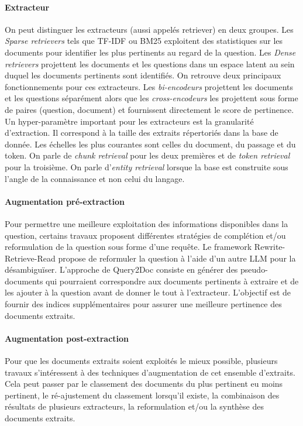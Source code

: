         \paragraph{Extracteur} On peut distinguer les extracteurs (aussi appelés retriever) en deux groupes. Les \textit{Sparse retrievers} tels que TF-IDF ou BM25 \cite{sparck_jones_statistical_1972,lu_bm25s_2024} exploitent des statistiques sur les documents pour identifier les plus pertinents au regard de la question. Les \textit{Dense retrievers} projettent les documents et les questions dans un espace latent au sein duquel les documents pertinents sont identifiés. On retrouve deux principaux fonctionnements pour ces extracteurs. Les \textit{bi-encodeurs} projettent les documents et les questions séparément alors que les \textit{cross-encodeurs} les projettent sous forme de paires (question, document) et fournissent directement le score de pertinence.\\
        Un hyper-paramètre important pour les extracteurs est la granularité d'extraction. Il correspond à la taille des extraits répertoriés dans la base de donnée. Les échelles les plus courantes sont celles du document, du passage et du token. On parle de \textit{chunk retrieval} pour les deux premières et de \textit{token retrieval} pour la troisième. On parle d'\textit{entity retrieval} lorsque la base est construite sous l'angle de la connaissance et non celui du langage.

        \paragraph{Augmentation pré-extraction} Pour permettre une meilleure exploitation des informations disponibles dans la question, certains travaux proposent différentes stratégies de complétion et/ou reformulation de la question sous forme d'une requête. Le framework Rewrite-Retrieve-Read \cite{ma_query_2023} propose de reformuler la question à l'aide d'un autre LLM pour la désambiguïser. L'approche de Query2Doc \cite{wang_query2doc_2023} consiste en générer des pseudo-documents qui pourraient correspondre aux documents pertinents à extraire et de les ajouter à la question avant de donner le tout à l'extracteur. L'objectif est de fournir des indices supplémentaires pour assurer une meilleure pertinence des documents extraits.
        

        \paragraph{Augmentation post-extraction} Pour que les documents extraits soient exploités le mieux possible, plusieurs travaux s'intéressent à des techniques d'augmentation de cet ensemble d'extraits. Cela peut passer par le classement des documents du plus pertinent eu moins pertinent, le ré-ajustement du classement lorsqu'il existe, la combinaison des résultats de plusieurs extracteurs, la reformulation et/ou la synthèse des documents extraits.

